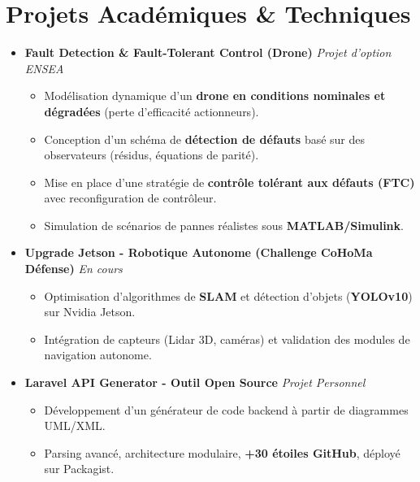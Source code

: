 \documentclass[a4paper,11pt]{article}
\begin{document}
\section{Projets Académiques \& Techniques}
\begin{itemize}[leftmargin=*, label={}]

\item \textbf{Fault Detection \& Fault-Tolerant Control (Drone)} \hfill \textit{Projet d'option ENSEA}
\vspace{-2pt}
    \begin{itemize}[leftmargin=0.4cm, nosep, label=\tiny$\bullet$]
        \item \small{Modélisation dynamique d'un \textbf{drone en conditions nominales et dégradées} (perte d'efficacité actionneurs).}
        \item \small{Conception d'un schéma de \textbf{détection de défauts} basé sur des observateurs (résidus, équations de parité).}
        \item \small{Mise en place d'une stratégie de \textbf{contrôle tolérant aux défauts (FTC)} avec reconfiguration de contrôleur.}
        \item \small{Simulation de scénarios de pannes réalistes sous \textbf{MATLAB/Simulink}.}
    \end{itemize}
    \vspace{3pt}

\item \textbf{Upgrade Jetson - Robotique Autonome (Challenge CoHoMa Défense)} \hfill \textit{En cours}
\vspace{-2pt}
    \begin{itemize}[leftmargin=0.4cm, nosep, label=\tiny$\bullet$]
        \item \small{Optimisation d'algorithmes de \textbf{SLAM} et détection d'objets (\textbf{YOLOv10}) sur Nvidia Jetson.}
        \item \small{Intégration de capteurs (Lidar 3D, caméras) et validation des modules de navigation autonome.}
    \end{itemize}
    \vspace{3pt}

\item \textbf{Laravel API Generator - Outil Open Source} \hfill \textit{Projet Personnel}
\vspace{-2pt}
    \begin{itemize}[leftmargin=0.4cm, nosep, label=\tiny$\bullet$]
        \item \small{Développement d'un générateur de code backend à partir de diagrammes UML/XML.}
        \item \small{Parsing avancé, architecture modulaire, \textbf{+30 étoiles GitHub}, déployé sur Packagist.}
    \end{itemize}
    \vspace{3pt}


\end{itemize}
\end{document}
